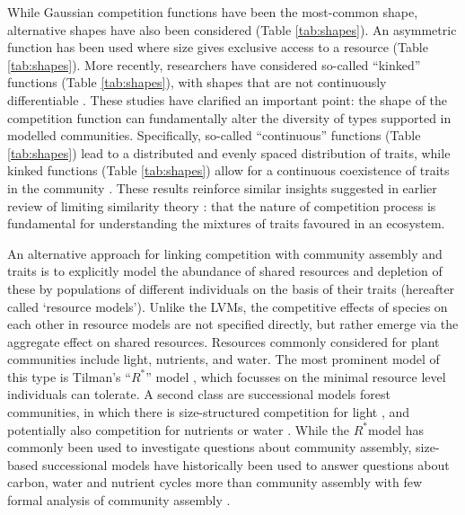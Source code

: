 \documentclass[a4paper,11pt]{article}
\newcommand{\Rstar}{\ensuremath{R^*}}
\begin{document}
While Gaussian competition functions have been the most-common shape, alternative shapes have also been considered (Table \ref{tab:shapes}). An asymmetric function has been used where size gives exclusive access to a resource \citep[e.g.]{Law-1997, Kisdi-1999, Geritz-1999, Egas-2004, Calcagno-2006, DAndrea-2013} (Table \ref{tab:shapes}). More recently, researchers have considered so-called ``kinked'' functions (Table \ref{tab:shapes}), with shapes that are not continuously differentiable \citep{Calcagno-2006, Scheffer-2006, Pigolotti-2007, Leimar-2013, Barabas-2013}. These studies have clarified an important point: the shape of the competition function can fundamentally alter the diversity of types supported in modelled communities. Specifically, so-called ``continuous'' functions (Table \ref{tab:shapes}) lead to a distributed and evenly spaced distribution of traits, while kinked functions (Table \ref{tab:shapes}) allow for a continuous coexistence of traits in the community \citep{Scheffer-2006, Pigolotti-2007, Leimar-2013, Barabas-2013, DAndrea-2013}. These results reinforce similar insights suggested in earlier review of limiting similarity theory \citep{Abrams-1983}: that the nature of competition process is fundamental for understanding the mixtures of traits favoured in an ecosystem.

An alternative approach for linking competition with community assembly and traits is to explicitly model the abundance of shared resources and depletion of these by populations of different individuals on the basis of their traits (hereafter called `resource models'). Unlike the LVMs, the competitive effects of species on each other in resource models are not specified directly, but rather emerge via the aggregate effect on shared resources. Resources commonly considered for plant communities include light, nutrients, and water. The most prominent model of this type is Tilman's ``\Rstar'' model \citep{Tilman-1977, Tilman-1982}, which focusses on the minimal resource level individuals can tolerate. A second class are successional models forest communities, in which there is size-structured competition for light \citep{Huston-1987,Kohyama-1993,Moorcroft-2001,Falster-2011,Falster-2016,Weng-2019}, and potentially also competition for nutrients or water \citep{Moorcroft-2001,Farrior-2013, Smith-2014, Fisher-2018,Weng-2019}. While the \Rstar  model has commonly been used to investigate questions about community assembly, size-based successional models have historically been used to answer questions about carbon, water and nutrient cycles more than community assembly \citep{Moorcroft-2001,Medvigy-2012,Smith-2014,Fisher-2018} with few formal analysis of community assembly \citep{Kohyama-1993}.
\end{document}
